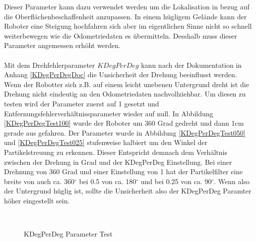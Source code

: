 \documentclass{article}
\begin{document}
Dieser Parameter kann dazu verwendet werden um die Lokalisation in bezug auf die Oberfl\"achenbeschaffenheit anzupassen. In einem h\"ugligem Gel\"ande kann der Roboter eine Steigung hochfahren sich aber im eigentlichen Sinne nicht so schnell weiterbewegen wie die Odometriedaten es \"ubermitteln. Desshalb muss dieser Parameter angemessen erh\"oht werden.
\\ \\
Mit dem Drehfehlerparameter $KDegPerDeg$ kann nach der Dokumentation in Anhang \ref{KDegPerDegDoc} die Unsicherheit der Drehung beeinflusst werden. Wenn der Robotter sich z.B. auf einem leicht unebenen Untergrund dreht ist die Drehung nicht eindeutig an den Odometriedaten nachvollziehbar. 
Um diesen zu testen wird der Parameter zuerst auf 1 gesetzt und Entfernungsfehlerverh\"altnissparameter wieder auf null.
In Abbildung \ref{KDegPerDegTest100} wurde der Roboter um 360 Grad gedreht und dann 1cm gerade aus gefahren. Der Parameter wurde in Abbildung \ref{KDegPerDegTest050} und \ref{KDegPerDegTest025} stufenweise halbiert um den Winkel der Partikelstreuung zu erkennen. Dieser Entspricht demnach dem Verh\"altnis zwischen der Drehung in Grad und der KDegPerDeg Einstellung. Bei einer Drehnung von 360 Grad und einer Einstellung von 1 hat der Partikelfilter eine breite von auch ca. 360$^\circ$ bei 0.5 von ca. 180$^\circ$ und bei 0.25 von ca. 90$^\circ$. Wenn also der Untergrund h\"uglig ist, sollte die Unsicherheit also der KDegPerDeg Paramter h\"oher eingestellt sein. 


\begin{figure}
  \centering
  \ 
  \ 
  \caption{KDegPerDeg Parameter Test}
  \label{KDegPerDegTestFigure}
\end{figure}
\end{document}
